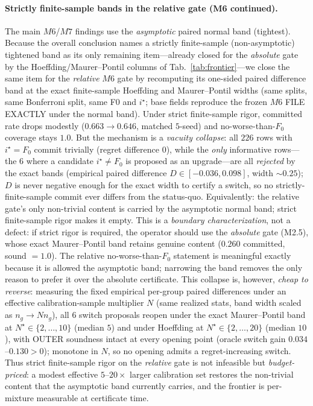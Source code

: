 \documentclass{article}
\begin{document}
\paragraph{Strictly finite-sample bands in the relative gate (M6 continued).}
The main $M6$/$M7$ findings use the \emph{asymptotic} paired normal band (tightest).
Because the overall conclusion names a strictly finite-sample (non-asymptotic) tightened
band as its only remaining item---already closed for the \emph{absolute} gate by the
Hoeffding/Maurer--Pontil columns of Tab.~\ref{tab:frontier}---we close the same item for the
\emph{relative} $M6$ gate by recomputing its one-sided paired difference band at the exact
finite-sample Hoeffding and Maurer--Pontil widths (same splits, same Bonferroni split,
same F0 and $i^\star$; base fields reproduce the frozen $M6$ FILE EXACTLY under the normal
band). Under strict finite-sample rigor, committed rate drops modestly
($0.663\to0.646$, matched $5$-seed) and no-worse-than-$F_0$ coverage stays $1.0$. But the
mechanism is a \emph{vacuity collapse}: all $226$ rows with $i^\star{=}F_0$ commit trivially
(regret difference $0$), while the \emph{only} informative rows---the $6$ where a candidate
$i^\star\ne F_0$ is proposed as an upgrade---are all \emph{rejected} by the exact bands
(empirical paired difference $D\!\in\![-0.036,0.098]$, width $\sim0.25$); $D$ is never
negative enough for the exact width to certify a switch, so no strictly-finite-sample commit
ever differs from the status-quo. Equivalently: the relative gate's only non-trivial content
is carried by the asymptotic normal band; strict finite-sample rigor makes it empty. This is
a \emph{boundary characterization}, not a defect: if strict rigor is required, the operator
should use the \emph{absolute} gate (M2.5), whose exact Maurer--Pontil band retains genuine
content ($0.260$ committed, sound $=1.0$). The relative no-worse-than-$F_0$ statement is
meaningful exactly because it is allowed the asymptotic band; narrowing the band removes the
only reason to prefer it over the absolute certificate. This collapse is, however, \emph{cheap
to reverse}: measuring the fixed empirical per-group paired differences under an effective
calibration-sample multiplier $N$ (same realized stats, band width scaled as $n_g\!\to\!N n_g$),
all $6$ switch proposals reopen under the exact Maurer--Pontil band at $N^\star\!\in\!\{2,\dots,
10\}$ (median $5$) and under Hoeffding at $N^\star\!\in\!\{2,\dots,20\}$ (median $10$), with
OUTER soundness intact at every opening point (oracle switch gain $0.034$--$0.130>0$); monotone
in $N$, so no opening admits a regret-increasing switch. Thus strict finite-sample rigor on the
\emph{relative} gate is not infeasible but \emph{budget-priced}: a modest effective
$5$--$20\!\times$ larger calibration set restores the non-trivial content that the asymptotic
band currently carries, and the frontier is per-mixture measurable at certificate time.
\end{document}
